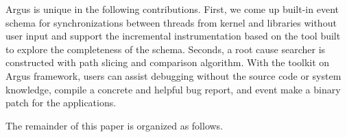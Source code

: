 Argus is unique in the following contributions.
First, we come up built-in event schema for synchronizations between threads from kernel and libraries without user input and support the incremental instrumentation based on the tool built to explore the completeness of the schema.
Seconds, a root cause searcher is constructed with path slicing and comparison algorithm.
With the toolkit on Argus framework, users can assist debugging without the source code or system knowledge, compile a concrete and helpful bug report, and event make a binary patch for the applications.

The remainder of this paper is organized as follows.
